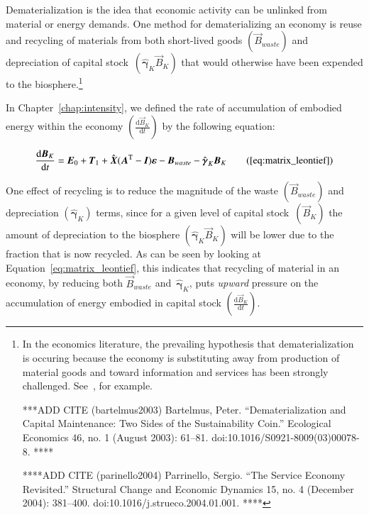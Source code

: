 Dematerialization is the idea that economic activity can be unlinked 
from material or energy demands.\cite{FischerKowalski:2011uo} 
One method for dematerializing an economy 
is reuse and recycling of materials from both
short-lived goods
$\left(\vec{B}_{waste}\right)$
and depreciation of 
capital 
stock~$\left(\hat{\boldsymbol{\gamma}}_{K}\vec{B}_{K}\right)$
that would otherwise have
been expended to the biosphere.\footnote{In the economics literature, the prevailing hypothesis that
dematerialization is occuring because the economy is substituting away from production of material goods 
and toward information and services has been strongly challenged. See~\cite{bartelmus2003,parenelli2004}, for example.


***ADD CITE (bartelmus2003) Bartelmus, Peter. “Dematerialization and Capital Maintenance: Two Sides of the Sustainability Coin.” Ecological Economics 46, no. 1 (August 2003): 61–81. doi:10.1016/S0921-8009(03)00078-8. **** 

****ADD CITE (parinello2004) Parrinello, Sergio. “The Service Economy Revisited.” Structural Change and Economic Dynamics 15, no. 4 (December 2004): 381–400. doi:10.1016/j.strueco.2004.01.001. ****}




In Chapter~\ref{chap:intensity},
we defined the rate of accumulation 
of embodied energy within the economy
$\left(\frac{\mathrm{d}\vec{B}_{K}}{\mathrm{d}t}\right)$
by the following equation:

\begin{equation}
	\frac{\mathrm{d}\vec{B}_{K}}{\mathrm{d}t} 
	= \vec{E}_{0}
	+ \vec{T}_{1}
	+ \hat{\vec{X}} (\vec{A}^{\mathrm{T}} - \vec{I})\boldsymbol{\varepsilon} 
	- \vec{B}_{waste}
	- \hat{\boldsymbol{\gamma}}_{K}\vec{B}_{K}\tag{\ref{eq:matrix_leontief}}
\end{equation}

One effect of recycling is to reduce the magnitude 
of the waste 
$\left(\vec{B}_{waste}\right)$
and depreciation 
$\left(\hat{\boldsymbol{\gamma}}_{K}\right)$ 
terms,
since for a given level of capital 
stock~$\left(\vec{B}_{K}\right)$
the amount of depreciation to the 
biosphere $\left(\hat{\boldsymbol{\gamma}}_{K}\vec{B}_{K}\right)$
will be lower due to the fraction that
is now recycled.
As can be seen by looking at 
Equation~\ref{eq:matrix_leontief},
this indicates that 
recycling of material in an economy, 
by reducing both $\vec{B}_{waste}$ 
and~$\hat{\boldsymbol{\gamma}}_{K}$, 
puts \emph{upward} pressure on the accumulation of 
energy embodied in capital stock
$\left(\frac{\mathrm{d}\vec{B}_{K}}{\mathrm{d}t}\right)$.

